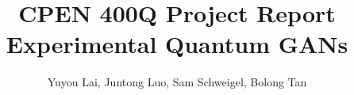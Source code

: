 \documentclass[12pt]{article}
\title{CPEN 400Q Project Report\\
  Experimental Quantum GANs}
\author{Yuyou Lai, Juntong Luo, Sam Schweigel, Bolong Tan}
\date{}
\begin{document}
\maketitle

\tableofcontents

\pagebreak
% 






\pagebreak

\printbibliography
\end{document}
